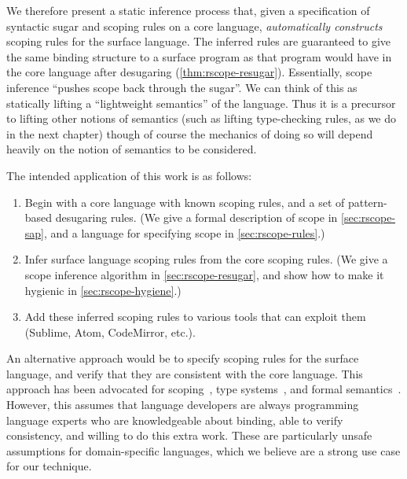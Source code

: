 We therefore present a static inference process that, given a
specification of syntactic sugar and scoping rules on a core language,
\emph{automatically constructs} scoping rules for the surface
language. The inferred rules are guaranteed to give the same binding
structure to a surface program as that program would have in the core language
after desugaring (\cref{thm:rscope-resugar}).
Essentially, scope inference ``pushes scope back through the sugar''. We
can think of this as statically lifting a ``lightweight semantics'' of
the language. Thus it is a precursor to lifting other notions of semantics
(such as lifting type-checking rules, as we do in the next chapter)
though of course the mechanics of doing so will depend heavily on the
notion of semantics to be considered.

The intended application of this work is as follows:
\begin{enumerate}
\item Begin with a core language with known scoping rules, and a set
  of pattern-based desugaring rules. (We give a formal description of
  scope in \cref{sec:rscope-sap}, and a language for specifying scope in
  \cref{sec:rscope-rules}.)
\item Infer surface language scoping rules from the core scoping
  rules. (We give a scope inference algorithm in
  \cref{sec:rscope-resugar}, and show how to make it hygienic in
  \cref{sec:rscope-hygiene}.)
\item Add these inferred scoping rules to various tools that can exploit
  them (Sublime, Atom, CodeMirror, etc.).
\end{enumerate}

An alternative approach would be to specify scoping rules for the
surface language, and verify that they are consistent with the core
language. This approach has been advocated for
scoping~\cite{herman-hygiene,stansifer-romeo},
type systems~\cite{SoundExt},
and formal semantics~\cite{ziggurat}.
However, this assumes that language developers are always programming
language experts who are knowledgeable about binding, able to verify consistency, and willing
to do this extra work. These are particularly unsafe assumptions for
domain-specific languages, which we believe are a strong use case for
our technique.

